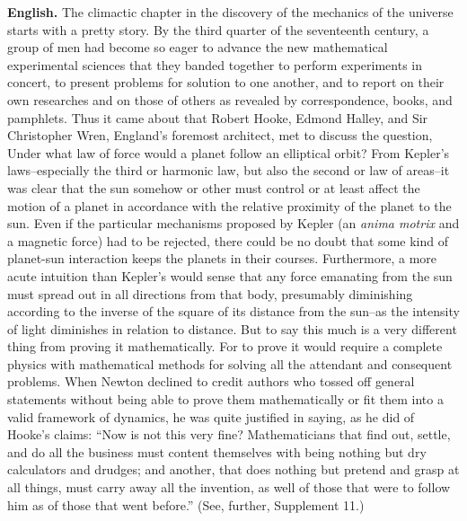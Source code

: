 \noindent\textbf{English.} The climactic chapter in the discovery of the mechanics of the universe starts with a pretty story. By the third quarter of the seventeenth century, a group of men had become so eager to advance the new mathematical experimental sciences that they banded together to perform experiments in concert, to present problems for solution to one another, and to report on their own researches and on those of others as revealed by correspondence, books, and pamphlets. Thus it came about that Robert Hooke, Edmond Halley, and Sir Christopher Wren, England's foremost architect, met to discuss the question, Under what law of force would a planet follow an elliptical orbit? From Kepler's laws--especially the third or harmonic law, but also the second or law of areas--it was clear that the sun somehow or other must control or at least affect the motion of a planet in accordance with the relative proximity of the planet to the sun. Even if the particular mechanisms proposed by Kepler (an \emph{anima motrix} and a magnetic force) had to be rejected, there could be no doubt that some kind of planet-sun interaction keeps the planets in their courses. Furthermore, a more acute intuition than Kepler's would sense that any force emanating from the sun must spread out in all directions from that body, presumably diminishing according to the inverse of the square of its distance from the sun--as the intensity of light diminishes in relation to distance. But to say this much is a very different thing from proving it mathematically. For to prove it would require a complete physics with mathematical methods for solving all the attendant and consequent problems. When Newton declined to credit authors who tossed off general statements without being able to prove them mathematically or fit them into a valid framework of dynamics, he was quite justified in saying, as he did of Hooke's claims: ``Now is not this very fine? Mathematicians that find out, settle, and do all the business must content themselves with being nothing but dry calculators and drudges; and another, that does nothing but pretend and grasp at all things, must carry away all the invention, as well of those that were to follow him as of those that went before.'' (See, further, Supplement 11.)
